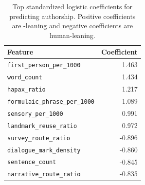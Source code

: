 \begin{table}[t]
    \centering
    \begin{tabular}{@{}lr@{}}
        \toprule
        \textbf{Feature} & \textbf{Coefficient} \\
        \midrule
        \texttt{first\_person\_per\_1000} & 1.463 \\
        \texttt{word\_count} & 1.434 \\
        \texttt{hapax\_ratio} & 1.217 \\
        \texttt{formulaic\_phrase\_per\_1000} & 1.089 \\
        \texttt{sensory\_per\_1000} & 0.991 \\
        \texttt{landmark\_reuse\_ratio} & 0.972 \\
        \texttt{survey\_route\_ratio} & -0.896 \\
        \texttt{dialogue\_mark\_density} & -0.860 \\
        \texttt{sentence\_count} & -0.845 \\
        \texttt{narrative\_route\_ratio} & -0.835 \\
        \bottomrule
    \end{tabular}
    \caption{Top standardized logistic coefficients for predicting \llm authorship. Positive coefficients are \llm-leaning and negative coefficients are human-leaning.}
    \label{tab:top-coefficients}
\end{table}
